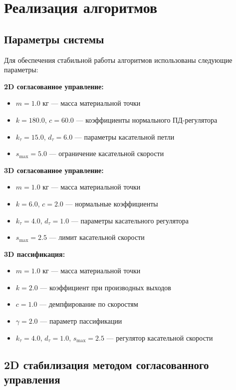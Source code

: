 \section{Реализация алгоритмов}

\subsection{Параметры системы}

Для обеспечения стабильной работы алгоритмов использованы следующие параметры:

\textbf{2D согласованное управление:}
\begin{itemize}
\item $m = 1.0$ кг --- масса материальной точки
\item $k = 180.0$, $c = 60.0$ --- коэффициенты нормального ПД-регулятора
\item $k_\tau = 15.0$, $d_\tau = 6.0$ --- параметры касательной петли
\item $s_{\max} = 5.0$ --- ограничение касательной скорости
\end{itemize}

\textbf{3D согласованное управление:}
\begin{itemize}
\item $m = 1.0$ кг --- масса материальной точки
\item $k = 6.0$, $c = 2.0$ --- нормальные коэффициенты
\item $k_\tau = 4.0$, $d_\tau = 1.0$ --- параметры касательного регулятора
\item $s_{\max} = 2.5$ --- лимит касательной скорости
\end{itemize}

\textbf{3D пассификация:}
\begin{itemize}
\item $m = 1.0$ кг --- масса материальной точки
\item $k = 2.0$ --- коэффициент при производных выходов
\item $c = 1.0$ --- демпфирование по скоростям
\item $\gamma = 2.0$ --- параметр пассификации
\item $k_\tau = 4.0$, $d_\tau = 1.0$, $s_{\max} = 2.5$ --- регулятор касательной скорости
\end{itemize}

\subsection{2D стабилизация методом согласованного управления}

